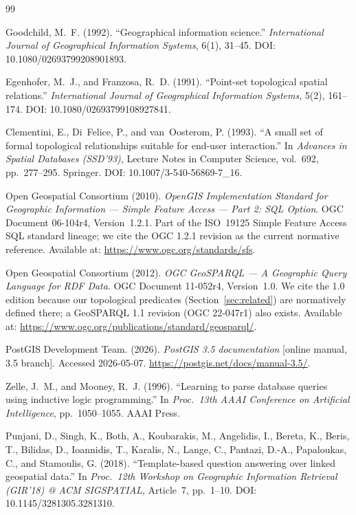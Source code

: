 \documentclass[11pt]{article}
\begin{document}
\begin{thebibliography}{99}

 Goodchild, M.~F. (1992). ``Geographical information science.'' \emph{International Journal of Geographical Information Systems}, 6(1), 31--45. DOI: 10.1080/02693799208901893.

 Egenhofer, M.~J., and Franzosa, R.~D. (1991). ``Point-set topological spatial relations.'' \emph{International Journal of Geographical Information Systems}, 5(2), 161--174. DOI: 10.1080/02693799108927841.

 Clementini, E., Di~Felice, P., and van~Oosterom, P. (1993). ``A small set of formal topological relationships suitable for end-user interaction.'' In \emph{Advances in Spatial Databases (SSD'93)}, Lecture Notes in Computer Science, vol.~692, pp.~277--295. Springer. DOI: 10.1007/3-540-56869-7\_16.

 Open Geospatial Consortium (2010). \emph{OpenGIS Implementation Standard for Geographic Information --- Simple Feature Access --- Part 2: SQL Option}. OGC Document 06-104r4, Version~1.2.1. Part of the ISO~19125 Simple Feature Access SQL standard lineage; we cite the OGC 1.2.1 revision as the current normative reference. Available at: \url{https://www.ogc.org/standards/sfs}.

 Open Geospatial Consortium (2012). \emph{OGC GeoSPARQL --- A Geographic Query Language for RDF Data}. OGC Document 11-052r4, Version~1.0. We cite the 1.0 edition because our topological predicates (Section~\ref{sec:related}) are normatively defined there; a GeoSPARQL 1.1 revision (OGC 22-047r1) also exists. Available at: \url{https://www.ogc.org/publications/standard/geosparql/}.

PostGIS Development Team. (2026). \emph{PostGIS 3.5 documentation}
[online manual, 3.5 branch]. Accessed 2026-05-07.
\url{https://postgis.net/docs/manual-3.5/}.

 Zelle, J.~M., and Mooney, R.~J. (1996). ``Learning to parse database queries using inductive logic programming.'' In \emph{Proc.\ 13th AAAI Conference on Artificial Intelligence}, pp.~1050--1055. AAAI Press.

 Punjani, D., Singh, K., Both, A., Koubarakis, M., Angelidis, I., Bereta, K., Beris, T., Bilidas, D., Ioannidis, T., Karalis, N., Lange, C., Pantazi, D.-A., Papaloukas, C., and Stamoulis, G. (2018). ``Template-based question answering over linked geospatial data.'' In \emph{Proc.\ 12th Workshop on Geographic Information Retrieval (GIR'18) @ ACM SIGSPATIAL}, Article~7, pp.~1--10. DOI: 10.1145/3281305.3281310.


\end{thebibliography}
\end{document}
